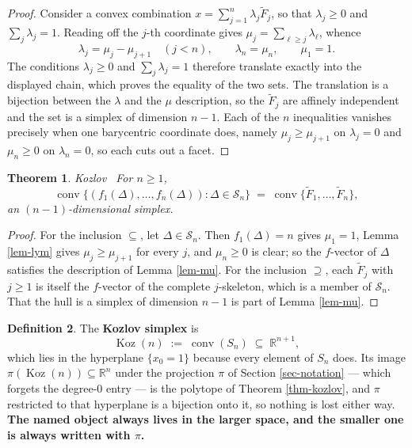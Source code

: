 \documentclass[11pt, a4paper, abstract=yes]{scrartcl}
\theoremstyle{definition}
\newtheorem{definition}{Definition}
\theoremstyle{remark}
\theoremstyle{plain}
\newtheorem{theorem}[definition]{Theorem}
\newcommand{\Koz}{\operatorname{Koz}}
\newcommand{\proj}{\pi}
\newcommand{\leanpartial}{\tikz[baseline=-0.6ex]{\fill[leanfull] (0,-0.6ex) arc (-90:90:0.6ex) -- cycle;\draw[leanfull,line width=0.5pt] (0,0) circle (0.6ex);}}
\newcommand{\leanmark}[1]{\leavevmode{\reversemarginpar\marginnote{\raggedleft#1}}}
\newcommand{\conv}{\operatorname{conv}}
\begin{document}
\begin{proof}
Consider a convex combination \(x=\sum_{j=1}^n\lambda_j\tilde F_j\), so that \(\lambda_j\ge0\) and
\(\sum_j\lambda_j=1\). Reading off the \(j\)-th coordinate gives \(\mu_j=\sum_{\ell\ge j}\lambda_\ell\),
whence
\begin{equation}\label{eq:mu-2}
  \lambda_j=\mu_j-\mu_{j+1}\quad(j<n),\qquad \lambda_n=\mu_n,\qquad \mu_1=1 .
\end{equation}
The conditions \(\lambda_j\ge0\) and \(\sum_j\lambda_j=1\) therefore translate exactly into the
displayed chain, which proves the equality of the two sets. The translation is a bijection between
the \(\lambda\) and the \(\mu\) description, so the \(\tilde F_j\) are affinely independent and the
set is a simplex of dimension \(n-1\). Each of the \(n\) inequalities vanishes precisely when one
barycentric coordinate does, namely \(\mu_j\ge\mu_{j+1}\) on \(\lambda_j=0\) and \(\mu_n\ge0\) on
\(\lambda_n=0\), so each cuts out a facet.
\end{proof}

\begin{theorem}
\leanmark{\leanpartial}\relax Kozlov~\cite[Theorem 4.1]{Kozlov1997} For \(n\ge1\),
\begin{equation}\label{eq:kozlov}
  \conv\bigl\lbrace(f_1(\Delta),\dots,f_n(\Delta)):\Delta\in\mathcal S_n\bigr\rbrace
  \;=\;\conv\lbrace\tilde F_1,\dots,\tilde F_n\rbrace,
\end{equation}
an \((n-1)\)-dimensional simplex.
\label{thm:kozlov}
\label{thm-kozlov}
\end{theorem}

\begin{proof}
For the inclusion \(\subseteq\), let \(\Delta\in\mathcal S_n\). Then \(f_1(\Delta)=n\) gives
\(\mu_1=1\), Lemma \ref{lem-lym} gives \(\mu_j\ge\mu_{j+1}\) for every \(j\), and \(\mu_n\ge0\) is
clear; so the \(f\)-vector of \(\Delta\) satisfies the description of Lemma \ref{lem-mu}. For the
inclusion \(\supseteq\), each \(\tilde F_j\) with \(j\ge1\) is itself the \(f\)-vector of the complete
\(j\)-skeleton, which is a member of \(\mathcal S_n\). That the hull is a simplex of dimension
\(n-1\) is part of Lemma \ref{lem-mu}.
\end{proof}

\begin{definition}
The \textbf{Kozlov simplex} is
\begin{equation}\label{eq:kozsimplex}
  \Koz(n)\;:=\;\conv(S_n)\;\subseteq\;\mathbb R^{n+1},
\end{equation}
which lies in the hyperplane \(\lbrace x_0=1\rbrace\) because every element of \(S_n\) does. Its
image \(\proj(\Koz(n))\subseteq\mathbb R^n\) under the projection \(\proj\) of
Section \ref{sec-notation} --- which forgets the degree-\(0\) entry --- is the polytope of
Theorem \ref{thm-kozlov}, and \(\proj\) restricted to that hyperplane is a bijection onto it, so
nothing is lost either way. \textbf{\textbf{The named object always lives in the larger space, and the smaller
one is always written with \(\proj\).}}
\label{def:kozsimplex}
\label{def-kozsimplex}
\end{definition}
\end{document}
